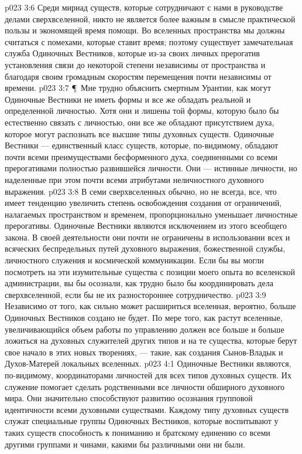 \vs p023 3:6 Среди мириад существ, которые сотрудничают с нами в руководстве делами сверхвселенной, никто не является более важным в смысле практической пользы и экономящей время помощи. Во вселенных пространства мы должны считаться с помехами, которые ставит время; поэтому существует замечательная служба Одиночных Вестников, которые из\hyp{}за своих личных прерогатив установления связи до некоторой степени независимы от пространства и благодаря своим громадным скоростям перемещения почти независимы от времени.
\vs p023 3:7 \P\ Мне трудно объяснить смертным Урантии, как могут Одиночные Вестники не иметь формы и все же обладать реальной и определенной личностью. Хотя они и лишены той формы, которую было бы естественно связать с личностью, они все же обладают присутствием духа, которое могут распознать все высшие типы духовных существ. Одиночные Вестники --- единственный класс существ, которые, по\hyp{}видимому, обладают почти всеми преимуществами бесформенного духа, соединенными со всеми прерогативами полностью развившейся личности. Они --- истинные личности, но наделенные при этом почти всеми атрибутами неличностного духовного выражения.
\vs p023 3:8 В семи сверхвселенных обычно, но не всегда, все, что имеет тенденцию увеличить степень освобождения создания от ограничений, налагаемых пространством и временем, пропорционально уменьшает личностные прерогативы. Одиночные Вестники являются исключением из этого всеобщего закона. В своей деятельности они почти не ограничены в использовании всех и всяческих беспредельных путей духовного выражения, божественной службы, личностного служения и космической коммуникации. Если бы вы могли посмотреть на эти изумительные существа с позиции моего опыта во вселенской администрации, вы бы осознали, как трудно было бы координировать дела сверхвселенной, если бы не их разностороннее сотрудничество.
\vs p023 3:9 Независимо от того, как сильно может расшириться вселенная, вероятно, больше Одиночных Вестников создано не будет. По мере того, как растут вселенные, увеличивающийся объем работы по управлению должен все больше и больше ложиться на духовных служителей других типов и на те существа, которые берут свое начало в этих новых творениях, --- такие, как создания Сынов\hyp{}Владык и Духов\hyp{}Матерей локальных вселенных.
\vs p023 4:1 Одиночные Вестники являются, по\hyp{}видимому, координаторами личностей для всех типов духовных существ. Их служение помогает сделать родственными все личности обширного духовного мира. Они значительно способствуют развитию осознания групповой идентичности всеми духовными существами. Каждому типу духовных существ служат специальные группы Одиночных Вестников, которые воспитывают у таких существ способность к пониманию и братскому единению со всеми другими группами и чинами, какими бы различными они ни были.
